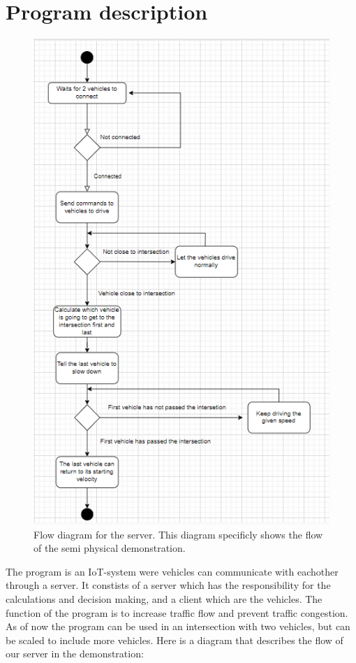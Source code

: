 \section{Program description}

\begin{figure}[h!]
	\centering
	\includegraphics[width=1\linewidth]{figures/Flow_diagram_server}
	\caption[Flow diagram server]{Flow diagram for the server. This diagram specificly shows the flow of the semi physical demonstration.}
	\label{fig:diagramserver}
\end{figure}

The program is an IoT-system were vehicles can communicate with eachother through a server. It constists of a server which has the responsibility for the calculations and decision making, and a client which are the vehicles. The function of the program is to increase traffic flow and prevent traffic congestion. As of now the program can be used in an intersection with two vehicles, but can be scaled to include more vehicles. Here is a diagram that describes the flow of our server in the demonstration:



